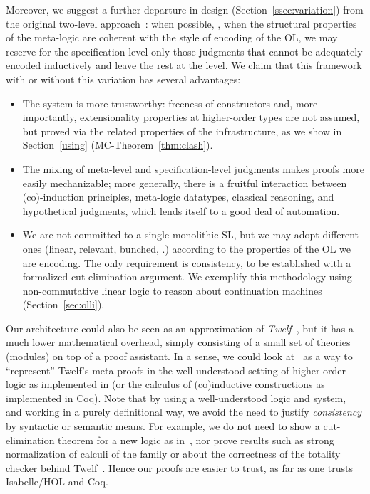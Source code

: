 \documentclass[final]{svjour3}
\begin{document}
Moreover, we suggest a further departure in design
(Section~\ref{ssec:variation}) from the original two-level
approach~\cite{McDowell01}: when possible, \ie, when the
structural properties of the meta-logic are coherent with the style of
encoding of the OL, we may reserve for the specification level only those
judgments that cannot be {adequately} encoded inductively and
leave the rest at the \HOL level.  We claim that this framework with
or without this variation has several advantages:

\begin{itemize}
\item The system is more trustworthy: freeness of constructors and,
  more importantly, extensionality properties at higher-order types are not
  assumed, but proved via the related properties of the
  infrastructure, as we show in Section~\ref{using} 
  (MC-Theorem~\ref{thm:clash}).
\item The mixing of meta-level and specification-level judgments makes proofs more
  easily mechanizable; more generally, there is a fruitful
  interaction between (co)-induction principles, meta-logic
  datatypes, classical reasoning, and hypothetical judgments, which
  lends itself to a good deal of automation.

\item We are not committed to a single monolithic SL,
  but we may adopt different ones (linear, relevant, bunched, \etc.)
  according to the properties of the OL we are encoding. The only
  requirement is consistency, to be established with a formalized
  cut-elimination argument.  We exemplify this methodology using
  non-commutative linear logic to reason about continuation machines
  (Section~\ref{sec:olli}).
\end{itemize}
 
Our architecture could also be seen as an approximation
of \emph{Twelf}~\cite{TwelfSP},
but it has a much lower mathematical overhead, simply consisting of a
small set of theories (modules) on top of a proof assistant. In a
sense, we could look at \hybrid\ as a way to ``represent'' Twelf's
meta-proofs in the well-understood setting of higher-order logic as
implemented in \HOL (or the calculus of (co)inductive constructions as
implemented in Coq). Note that by using a well-understood logic and
system, and working in a purely definitional way, we avoid the need to
justify \emph{consistency} by syntactic or semantic means.  For
example, we do not need to show a cut-elimination theorem for a new
logic as in~\cite{gacek08lics}, nor prove results such as strong
normalization of calculi of the  family \cite{S00} or
about the correctness of the totality checker behind
Twelf~\cite{SchurmannP03}. Hence our proofs are easier to trust, as
far as one trusts Isabelle/HOL and Coq.
\end{document}
